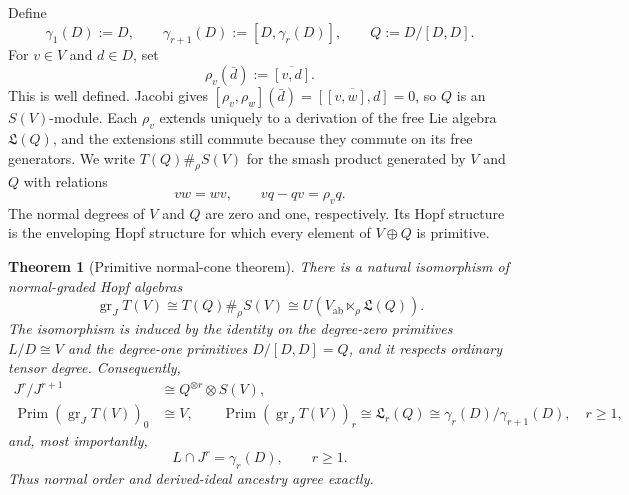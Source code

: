 \documentclass[10pt,reqno]{amsart}
\theoremstyle{plain}
\newtheorem{theorem}{Theorem}[section]
\theoremstyle{definition}
\theoremstyle{remark}
\begin{document}
Define
\[
 \gamma_1(D):=D,\qquad \gamma_{r+1}(D):=[D,\gamma_r(D)],
 \qquad Q:=D/[D,D].
\]
For \(v\in V\) and \(d\in D\), set
\begin{equation}
 \rho_v(\bar d):=\overline{[v,d]}.
 \label{cc:eq-rho}
\end{equation}
This is well defined.  Jacobi gives
\([\rho_v,\rho_w](\bar d)=\overline{[[v,w],d]}=0\), so \(Q\) is
an \(S(V)\)-module.  Each \(\rho_v\) extends uniquely to a derivation of
the free Lie algebra \({\mathfrak L}(Q)\), and the extensions still commute because
they commute on its free generators.  We write
\(T(Q)\#_\rho S(V)\) for the smash product generated by \(V\) and \(Q\)
with relations
\begin{equation}
 vw=wv,\qquad vq-qv=\rho_vq.
 \label{cc:eq-smash-relations}
\end{equation}
The normal degrees of \(V\) and \(Q\) are zero and one, respectively.  Its
Hopf structure is the enveloping Hopf structure for which every element of
\(V\oplus Q\) is primitive.

\begin{theorem}[Primitive normal-cone theorem]
\label{cc:thm-normal-cone}
There is a natural isomorphism of normal-graded Hopf algebras
\begin{equation}
 {\operatorname{gr}}_JT(V)\cong T(Q)\#_\rho S(V)
 \cong U\!\left(V_{\mathrm{ab}}\ltimes_\rho{\mathfrak L}(Q)\right).
 \label{cc:eq-normal-cone}
\end{equation}
The isomorphism is induced by the identity on the degree-zero primitives
\(L/D\cong V\) and the degree-one primitives \(D/[D,D]=Q\), and it
respects ordinary tensor degree.
Consequently,
\begin{align}
 J^r/J^{r+1}&\cong Q^{\otimes r}\otimes S(V),
 \label{cc:eq-normal-layer}\\
 {\operatorname{Prim}}({\operatorname{gr}}_JT(V))_0&\cong V,
 \qquad
 {\operatorname{Prim}}({\operatorname{gr}}_JT(V))_r
 \cong{\mathfrak L}_r(Q)\cong\gamma_r(D)/\gamma_{r+1}(D),
 \quad r\geq1,
 \label{cc:eq-primitive-layers}
\end{align}
and, most importantly,
\begin{equation}
 L\cap J^r=\gamma_r(D),\qquad r\geq1.
 \label{cc:eq-intersection}
\end{equation}
Thus normal order and derived-ideal ancestry agree exactly.
\end{theorem}
\end{document}
